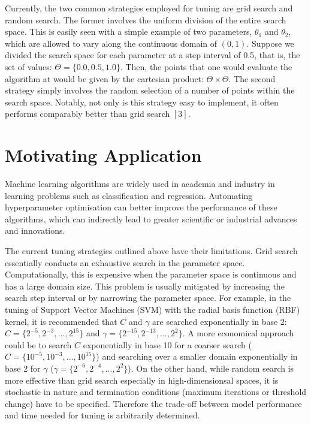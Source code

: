 \documentclass[letterpaper]{article}
\begin{document}
Currently, the two common strategies employed for tuning are grid search and
random search. The former involves the uniform division of the entire search
space. This is easily seen with a simple example of two parameters, $\theta_1$ and
$\theta_2$, which are allowed to vary along the continuous domain of $(0, 1)$.
Suppose we divided the search space for each parameter at a step interval of 0.5,
that is, the set of values: $\Theta=\{0.0, 0.5, 1.0\}$. Then, the points that one
would evaluate the algorithm at would be given by the cartesian product: $\Theta \times \Theta$.
The second strategy simply involves the random selection of a number of points
within the search space. Notably, not only is this strategy easy to implement, it
often performs comparably better than grid search $[3]$.

\section{Motivating Application}
Machine learning algorithms are widely used in academia and industry in learning
problems such as classification and regression. Automating hyperparameter optimisation
can better improve the performance of these algorithms, which can indirectly lead
to greater scientific or industrial advances and innovations.

The current tuning strategies outlined above have their limitations. Grid search essentially
conducts an exhaustive search in the parameter space. Computationally, this is expensive
when the parameter space is continuous and has a large domain size. This problem
is usually mitigated by increasing the search step interval
or by narrowing the parameter space. For example, in the tuning of Support Vector Machines
(SVM) with the radial basis function (RBF) kernel, it is recommended that $\textit{C}$ and $\gamma$ are searched
exponentially in base 2: $\textit{C}=\{2^{-5},2^{-3},...,2^{15}\}$ and
$\gamma=\{2^{-15},2^{-13},...,2^{2}\}$. A more economical approach could be to search
$\textit{C}$ exponentially in base 10 for a coarser search
($\textit{C}=\{10^{-5},10^{-3},...,10^{15}\}$) and searching over a smaller domain
exponentially in base 2 for $\gamma$ ($\gamma=\{2^{-6},2^{-4},...,2^{2}\}$). On the other hand, while random
search is more effective than grid search especially in high-dimensionsal spaces,
it is stochastic in nature and termination conditions (maximum iterations or threshold change)
have to be specified. Therefore the trade-off between model performance and time needed
for tuning is arbitrarily determined.
\end{document}
